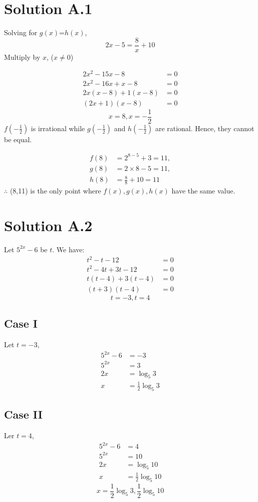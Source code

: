 \documentclass{article}
\begin{document}
\section*{Solution A.1}
Solving for $g(x)$=$h(x)$,
$$2x-5=\frac{8}{x}+10$$
Multiply by $x$, ($x\neq0$)

\begin{align*}
2x^2-15x-8&=0 \\
2x^2-16x+x-8&=0 \\
2x(x-8)+1(x-8)&=0\\
(2x+1)(x-8)&=0
\end{align*}
$$\boxed{x=8, x=-\frac{1}{2}}$$
$f\left(-\frac{1}{2}\right)$ is irrational while $g\left(-\frac{1}{2}\right)$ and $h\left(-\frac{1}{2}\right)$ are rational. Hence, they cannot be equal.

\begin{align*}
    f(8)&=2^{8-5}+3=11, \\
    g(8)&=2\times8-5=11, \\
    h(8)&=\frac{8}{8}+10=11
\end{align*}
$\therefore$ (8,11) is the only point where $f(x), g(x), h(x)$ have the same value.

\newpage
\section*{Solution A.2}
Let $5^{2x}-6$ be $t$. We have:
\begin{align*}
    t^2-t-12&=0 \\
    t^2-4t+3t-12&=0 \\
    t(t-4)+3(t-4)&=0 \\
    (t+3)(t-4)&=0
\end{align*}
$$\boxed{t=-3, t=4}$$
\subsection*{Case I}
Let $t=-3$,
\begin{align*}
    5^{2x}-6&=-3 \\
    5^{2x}&=3 \\
    2x &= \log_5{3} \\
    x &= \frac{1}{2}\log_5{3}
\end{align*}
\subsection*{Case II}
Ler $t=4$,
\begin{align*}
    5^{2x}-6&=4 \\
    5^{2x}&=10 \\
    2x&=\log_5{10} \\
    x&=\frac{1}{2}\log_5{10}
\end{align*}
$$\boxed{x=\frac{1}{2}\log_5{3}, \frac{1}{2}\log_5{10}}$$
\end{document}
